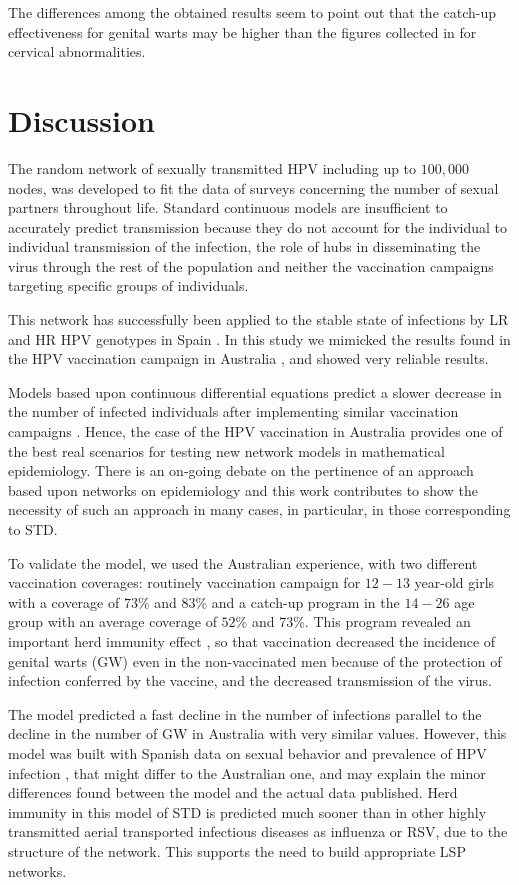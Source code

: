The differences among the obtained results seem to point out that the catch-up effectiveness for genital warts may be higher than the figures collected in \cite{Skufca} for cervical abnormalities.  

\section{Discussion}
The random network of sexually transmitted HPV including up to $100,000$ nodes, was developed to fit the data of surveys concerning the number of sexual partners throughout life. Standard continuous models are insufficient to accurately predict transmission because they do not account for the individual to individual transmission of the infection, the role of hubs in disseminating the virus through the rest of the population and neither the vaccination campaigns targeting specific groups of individuals.

This network has successfully been applied to the stable state of infections by LR and HR HPV genotypes in Spain  \cite{Acedo2017}. In this study we mimicked the results found in the HPV vaccination campaign in Australia \cite{ali2013genital}, and showed very reliable results. 

Models based upon continuous differential equations predict a slower decrease in the number of infected individuals after implementing similar vaccination campaigns \cite{elbasha2007model}. Hence, the case of the HPV vaccination in Australia provides one of the best real scenarios for testing new network models in mathematical epidemiology. There is an on-going debate on the pertinence of an approach based upon networks on epidemiology \cite{Eubank} and this work contributes to show the necessity of such an approach in many cases, in particular, in those corresponding to STD.

To validate the model, we used the Australian experience, with two different vaccination coverages: routinely vaccination campaign for $12-13$ year-old girls with a coverage of $73\%$ and $83\%$ and a catch-up program in the $14-26$ age group with an average coverage of $52\%$ and $73\%$. This program revealed an important herd immunity effect \cite{ali2013genital}, so that vaccination decreased the incidence of genital warts (GW) even in the non-vaccinated men because of the protection of infection conferred by the vaccine, and the decreased transmission of the virus.

The model predicted a fast decline in the number of infections parallel to the decline in the number of GW in Australia with very similar values. However, this model was built with Spanish data on sexual behavior \cite{INE} and prevalence of HPV infection \cite{castellsague2012prevalence}, that might differ to the Australian one, and may explain the minor differences found between the model and the actual data published. Herd immunity in this model of STD is predicted much sooner than in other highly transmitted aerial transported infectious diseases as influenza or RSV, due to the structure of the network. This supports the need to build appropriate LSP networks. 

